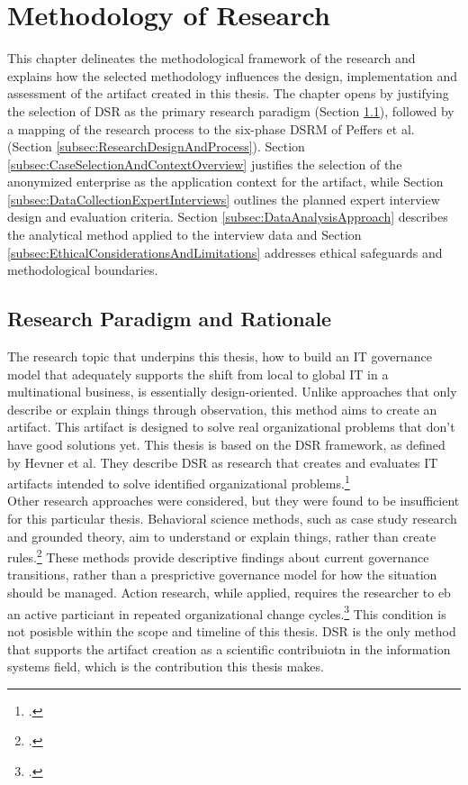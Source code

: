 \newpage
\section{Methodology of Research}
\label{sec:ResearchMethodology}
This chapter delineates the methodological framework of the research and explains how the selected methodology influences the design, implementation and assessment of the artifact created in this thesis.
The chapter opens by justifying the selection of \ac{DSR} as the primary research paradigm (Section \ref{subsec:ResearchParadigmAndRationale}), followed by a mapping of the research process to the six-phase \ac{DSRM} of Peffers et al. (Section \ref{subsec:ResearchDesignAndProcess}).
Section \ref{subsec:CaseSelectionAndContextOverview} justifies the selection of the anonymized enterprise as the application context for the artifact, while Section \ref{subsec:DataCollectionExpertInterviews} outlines the planned expert interview design and evaluation criteria.
Section \ref{subsec:DataAnalysisApproach} describes the analytical method applied to the interview data and Section \ref{subsec:EthicalConsiderationsAndLimitations} addresses ethical safeguards and methodological boundaries.

\subsection{Research Paradigm and Rationale}
\label{subsec:ResearchParadigmAndRationale}
The research topic that underpins this thesis, how to build an IT governance model that adequately supports the shift from local to global IT in a multinational business, is essentially design-oriented.
Unlike approaches that only describe or explain things through observation, this method aims to create an artifact.
This artifact is designed to solve real organizational problems that don't have good solutions yet.
This thesis is based on the \ac{DSR} framework, as defined by Hevner et al.
They describe DSR as research that creates and evaluates \glqq{}IT artifacts intended to solve identified organizational problems.\grqq{}\footcite[75]{hevnerDesignScienceInformation2004}
\\
Other research approaches were considered, but they were found to be insufficient for this particular thesis.
Behavioral science methods, such as case study research and grounded theory, aim to understand or explain things, rather than create rules.\footcite[75-77]{hevnerDesignScienceInformation2004}
These methods provide descriptive findings about current governance transitions, rather than a presprictive governance model for how the situation should be managed.
Action research, while applied, requires the researcher to eb an active particiant in repeated organizational change cycles.\footcite[2-3]{bennerwicknerLeitfadenNutzungDesign2020}
This condition is not posisble within the scope and timeline of this thesis.
\ac{DSR} is the only method that supports the artifact creation as a scientific contribuiotn in the information systems field, which is the contribution this thesis makes.

